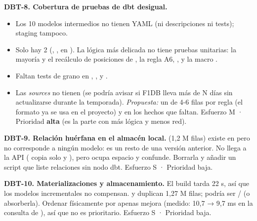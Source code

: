 \textbf{DBT-8. Cobertura de pruebas de dbt desigual.}

\begin{itemize}
\item Los 10 modelos intermedios no tienen YAML (ni descripciones ni tests); staging tampoco.
\item Solo hay 2  (, , en ). La lógica más delicada no tiene pruebas unitarias: la mayoría y el recálculo de posiciones de , la regla A6, ,  y la macro .
\item Faltan tests de grano en , ,  y .
\item Las \emph{sources} no tienen  (se podría avisar si F1DB lleva más de N días sin actualizarse durante la temporada). \emph{Propuesta:} un  de 4-6 filas por regla (el formato ya se usa en el proyecto) y  en los hechos que faltan. Esfuerzo M · Prioridad \textbf{alta} (es la parte con más lógica y menos red).
\end{itemize}

\textbf{DBT-9. Relación huérfana en el almacén local.}  (1,2 M filas) existe en  pero no corresponde a ningún modelo: es un resto de una versión anterior. No llega a la API ( copia solo  y ), pero ocupa espacio y confunde. Borrarla y añadir un script que liste relaciones sin nodo dbt. Esfuerzo S · Prioridad baja.

\textbf{DBT-10. Materializaciones y almacenamiento.} El build tarda 22 s, así que los modelos incrementales no compensan.  y  duplican 1,27 M filas;  podría ser / (o  absorberla). Ordenar físicamente  por  apenas mejora (medido: 10,7 → 9,7 ms en la consulta de ), así que no es prioritario. Esfuerzo S · Prioridad baja.

